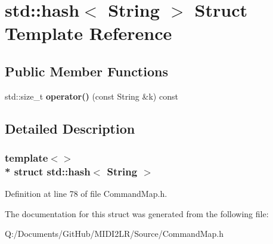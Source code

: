 \hypertarget{structstd_1_1hash_3_01_string_01_4}{}\section{std\+:\+:hash$<$ String $>$ Struct Template Reference}
\label{structstd_1_1hash_3_01_string_01_4}
\subsection*{Public Member Functions}
\begin{DoxyCompactItemize}
\item 
std\+::size\+\_\+t {\bfseries operator()} (const String \&k) const \hypertarget{structstd_1_1hash_3_01_string_01_4_a0b977450e21fcc6afb4f966bb8d0f844}{}\label{structstd_1_1hash_3_01_string_01_4_a0b977450e21fcc6afb4f966bb8d0f844}

\end{DoxyCompactItemize}


\subsection{Detailed Description}
\subsubsection*{template$<$$>$\\*
struct std\+::hash$<$ String $>$}



Definition at line 78 of file Command\+Map.\+h.



The documentation for this struct was generated from the following file\+:\begin{DoxyCompactItemize}
\item 
Q\+:/\+Documents/\+Git\+Hub/\+M\+I\+D\+I2\+L\+R/\+Source/Command\+Map.\+h\end{DoxyCompactItemize}
